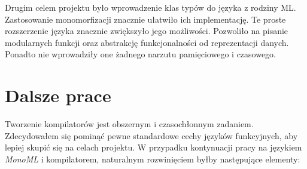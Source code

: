 \documentclass[declaration,shortabstract]{iithesis}
\begin{document}
Drugim celem projektu było wprowadzenie klas typów do języka z rodziny ML. 
Zastosowanie monomorfizacji znacznie ułatwiło ich implementację. Te proste
rozszerzenie języka znacznie zwiększyło jego możliwości. Pozwoliło na 
pisanie modularnych funkcji oraz abstrakcję funkcjonalności od reprezentacji 
danych. Ponadto nie wprowadziły one żadnego narzutu pamięciowego i czasowego.

\section{Dalsze prace}

Tworzenie kompilatorów jest obszernym i czasochłonnym zadaniem. Zdecydowałem 
się pominąć pewne standardowe cechy języków funkcyjnych, aby lepiej skupić 
się na celach projektu. W przypadku kontynuacji pracy na językiem \textit{MonoML}
i kompilatorem, naturalnym rozwinięciem byłby następujące elementy:
\end{document}

